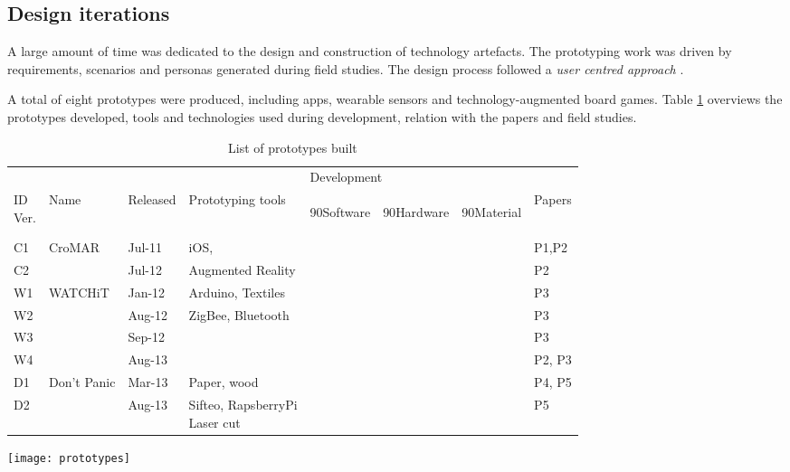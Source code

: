 \subsection{Design iterations}\label{design-iterations}

A large amount of time was dedicated to the design and construction of technology artefacts. The prototyping work was driven by requirements, scenarios and personas generated during field studies. The design process followed a \emph{user centred approach} \autocites{MAGUIRE:2001dp}{Gulliksen:2003hd}.

A total of eight prototypes were produced, including apps, wearable sensors and technology-augmented board games. Table \ref{prototypes} overviews the prototypes developed, tools and technologies used during development, relation with the papers and field studies.
\begin{table}
	[!p] \centering \caption{List of prototypes built} \label{prototypes} 
	\begin{threeparttable}
		\begin{tabular}{@{}llllllll@{}} 
			\toprule 
			& & & & \multicolumn{3}{l}{Development}  \\
			\cline{5-7} \noalign{\smallskip} 
			\specialcell[b]{ID\\Ver.} & Name & Released & Prototyping tools & 
			\begin{turn}
				{90}Software
			\end{turn}
			& 
			\begin{turn}
				{90}Hardware
			\end{turn}
			& 
			\begin{turn}
				{90}Material
			\end{turn}
			& Papers \\
			\midrule \noalign{\smallskip} C1 & CroMAR & Jul-11 & iOS, & \textbullet & & & P1,P2 \\
			C2 & & Jul-12 & Augmented Reality & \textbullet & & & P2 \\
			\hline \noalign{\smallskip} W1 & WATCHiT & Jan-12 & Arduino, Textiles & \textbullet & \textbullet & & P3 \\
			W2 & & Aug-12 & ZigBee, Bluetooth & \textbullet & \textbullet & & P3 \\
			W3 & & Sep-12 & & \textbullet & \textbullet & & P3 \\
			W4 & & Aug-13 & & \textbullet & \textbullet & \textbullet & P2, P3 \\
			\hline \noalign{\smallskip} D1 & Don't Panic & Mar-13 & Paper, wood & & & \textbullet & P4, P5 \\
			D2 & & Aug-13 & \specialcell[t]{Sifteo, RapsberryPi\\Laser cut} & \textbullet & \textbullet & \textbullet & P5 \\
			\bottomrule 
		\end{tabular}
		\begin{tablenotes}
			\item 
			\texttt{[image: prototypes]} 
		\end{tablenotes}
	\end{threeparttable}
\end{table}

